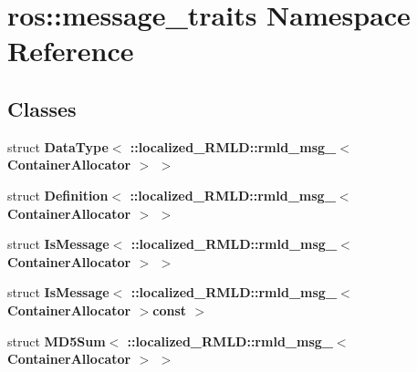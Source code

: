 \section{ros::message\_\-traits Namespace Reference}
\label{namespaceros_1_1message__traits}
\subsection*{Classes}
\begin{DoxyCompactItemize}
\item 
struct {\bf DataType$<$ ::localized\_\-RMLD::rmld\_\-msg\_\-$<$ ContainerAllocator $>$ $>$}
\item 
struct {\bf Definition$<$ ::localized\_\-RMLD::rmld\_\-msg\_\-$<$ ContainerAllocator $>$ $>$}
\item 
struct {\bf IsMessage$<$ ::localized\_\-RMLD::rmld\_\-msg\_\-$<$ ContainerAllocator $>$ $>$}
\item 
struct {\bf IsMessage$<$ ::localized\_\-RMLD::rmld\_\-msg\_\-$<$ ContainerAllocator $>$const  $>$}
\item 
struct {\bf MD5Sum$<$ ::localized\_\-RMLD::rmld\_\-msg\_\-$<$ ContainerAllocator $>$ $>$}
\end{DoxyCompactItemize}
